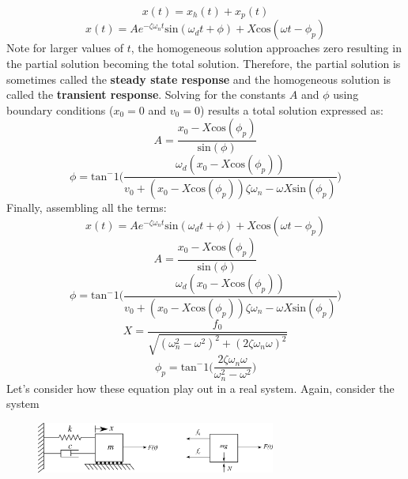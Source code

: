 \documentclass[12pt,letter]{article}
\numberwithin{ex}{section} %
\begin{document}
			\begin{equation}
				x(t) = x_h(t) + x_p(t)
			\end{equation}
			\begin{equation}
				x(t) = Ae^{-\zeta \omega_n t}\text{sin}(\omega_d t + \phi) +  X \text{cos}(\omega t - \phi_p)
			\end{equation}				
			Note for larger values of $t$, the homogeneous solution approaches zero resulting in the partial solution becoming the total solution. Therefore, the partial solution is sometimes called the \textbf{steady state response} and the homogeneous solution is called the \textbf{transient response}. Solving for the constants $A$ and $\phi$ using boundary conditions ($x_0=0$ and $v_0=0$) results a total solution expressed as:
			\begin{equation}
				A = \frac{x_0 -X \text{cos}(\phi_p)}{\text{sin}(\phi)}
			\end{equation}			 
			\begin{equation}
				\phi =  \text{tan}^-1\bigg(\frac{\omega_d ( x_0 -X \text{cos}(\phi_p))}{v_0 + (x_0 - X \text{cos}(\phi_p)) \zeta \omega_n - \omega X \text{sin}(\phi_p) }\bigg)
			\end{equation}			
			Finally, assembling all the terms:
			\begin{equation}
				x(t) = Ae^{-\zeta \omega_n t}\text{sin}(\omega_d t + \phi) +  X \text{cos}(\omega t - \phi_p)
			\end{equation}
			\begin{equation}
				A = \frac{x_0 -X \text{cos}(\phi_p)}{\text{sin}(\phi)}
			\end{equation}			 
			\begin{equation}
				\phi =  \text{tan}^-1\bigg(\frac{\omega_d ( x_0 -X \text{cos}(\phi_p))}{v_0 + (x_0 - X \text{cos}(\phi_p)) \zeta \omega_n - \omega X \text{sin}(\phi_p) }\bigg)
			\end{equation}	
			\begin{equation}
				X = \frac{f_0}{\sqrt{(\omega_n^2 - \omega^2)^2 +  (2\zeta \omega_n \omega)^2}} 
			\end{equation}	
			\begin{equation}
				\phi_p = \text{tan}^-1\bigg(\frac{2\zeta \omega_n \omega}{\omega_n^2 - \omega^2}\bigg)
			\end{equation}							
			Let's consider how these equation play out in a real system. Again, consider the system
			\begin{figure}[H]
				\centering
				\includegraphics[width=0.7\textwidth]{../Figures/system_and_FBD_1DOF_damped_forced_horiziontal.png}
			\end{figure}			
\end{document}
